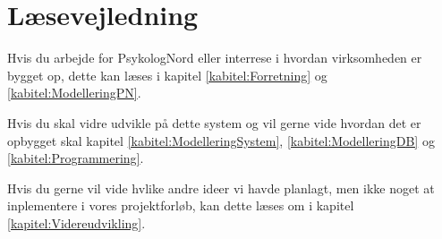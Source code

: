 \section{Læsevejledning}

Hvis du arbejde for PsykologNord eller interrese i hvordan virksomheden er bygget op, dette kan læses i kapitel \ref{kabitel:Forretning} og \ref{kabitel:ModelleringPN}.

Hvis du skal vidre udvikle på dette system og vil gerne vide hvordan det er opbygget skal kapitel \ref{kabitel:ModelleringSystem}, \ref{kabitel:ModelleringDB} og \ref{kabitel:Programmering}.

Hvis du gerne vil vide hvlike andre ideer vi havde planlagt, men ikke noget at inplementere i vores projektforløb, kan dette læses om i kapitel \ref{kapitel:Videreudvikling}.